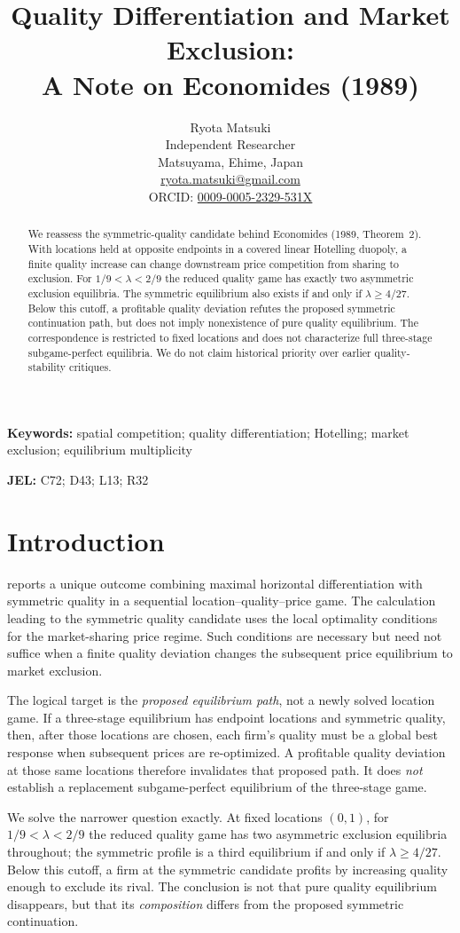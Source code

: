 \documentclass[11pt]{article}
\title{Quality Differentiation and Market Exclusion:\\A Note on Economides (1989)}
\author{Ryota Matsuki\\Independent Researcher\\Matsuyama, Ehime, Japan\\\href{mailto:ryota.matsuki@gmail.com}{ryota.matsuki@gmail.com}\\ORCID: \href{https://orcid.org/0009-0005-2329-531X}{0009-0005-2329-531X}}
\date{}
\begin{document}
\maketitle
\begin{abstract}
We reassess the symmetric-quality candidate behind
Economides (1989, Theorem~2). With locations held at
opposite endpoints in a covered linear Hotelling
duopoly, a finite quality increase can change
downstream price competition from sharing to
exclusion. For $1/9<\lambda<2/9$ the reduced
quality game has exactly two asymmetric exclusion
equilibria. The symmetric equilibrium also exists
if and only if $\lambda\geq4/27$. Below this
cutoff, a profitable quality deviation refutes
the proposed symmetric continuation path, but
does not imply nonexistence of pure quality
equilibrium. The correspondence is restricted to
fixed locations and does not characterize full
three-stage subgame-perfect equilibria. We do
not claim historical priority over earlier
quality-stability critiques.
\end{abstract}
\noindent\textbf{Keywords:} spatial competition; quality differentiation; Hotelling;
market exclusion; equilibrium multiplicity

\medskip
\noindent\textbf{JEL:} C72; D43; L13; R32

\section{Introduction}\label{sec:intro}
\citet[pp.~27--28, eqs.~(8)--(9) and Theorem~2]{Economides1989}
reports a unique outcome combining maximal horizontal
differentiation with symmetric quality in a sequential
location--quality--price game. The calculation leading to the
symmetric quality candidate uses the local optimality
conditions for the market-sharing price regime. Such
conditions are necessary but need not suffice when a
finite quality deviation changes the subsequent price
equilibrium to market exclusion.

The logical target is the \emph{proposed equilibrium path},
not a newly solved location game. If a three-stage
equilibrium has endpoint locations and symmetric quality,
then, after those locations are chosen, each firm's
quality must be a global best response when subsequent
prices are re-optimized. A profitable quality deviation
at those same locations therefore invalidates that
proposed path. It does \emph{not} establish a replacement
subgame-perfect equilibrium of the three-stage game.

We solve the narrower question exactly. At fixed
locations $(0,1)$, for $1/9<\lambda<2/9$ the reduced
quality game has two asymmetric exclusion equilibria
throughout; the symmetric profile is a third equilibrium
if and only if $\lambda\geq4/27$. Below this cutoff, a
firm at the symmetric candidate profits by increasing
quality enough to exclude its rival. The conclusion is
not that pure quality equilibrium disappears, but that
its \emph{composition} differs from the proposed
symmetric continuation.
\end{document}
